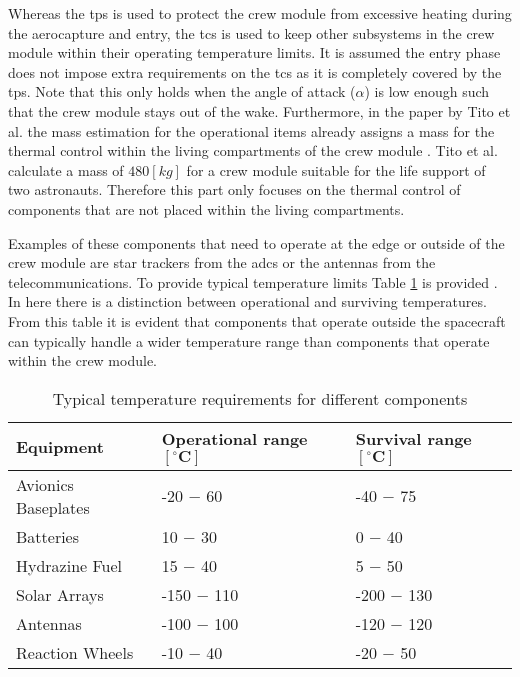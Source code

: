 Whereas the \gls{tps} is used to protect the crew module from excessive heating during the aerocapture and entry, the \gls{tcs} is used to keep other subsystems in the crew module within their operating temperature limits. It is assumed the entry phase does not impose extra requirements on the \gls{tcs} as it is completely covered by the \gls{tps}. Note that this only holds when the angle of attack ($\alpha$) is low enough such that the crew module stays out of the wake. Furthermore, in the paper by Tito et al. the mass estimation for the operational items already assigns a mass for the thermal control within the living compartments of the crew module \cite{Tito2013}. Tito et al. calculate a mass of $480 \left[kg\right]$ for a crew module suitable for the life support of two astronauts. Therefore this part only focuses on the thermal control of components that are not placed within the living compartments.

Examples of these components that need to operate at the edge or outside of the crew module are star trackers from the \gls{adcs} or the antennas from the telecommunications. To provide typical temperature limits Table \ref{tab:cmtherm} is provided \cite[p.686]{Wertz2011}. In here there is a distinction between operational and surviving temperatures. From this table it is evident that components that operate outside the spacecraft can typically handle a wider temperature range than components that operate within the crew module.

\begin{table}[h]
	\centering
	\caption{Typical temperature requirements for different components}
	\begin{tabular}{|l||l|l|}
		\hline
		\textbf{Equipment} & \textbf{Operational range $\mathbf{[^{\circ}C]}$} & \textbf{Survival range $\mathbf{[^{\circ}C]}$}\\ \hline \hline
		Avionics Baseplates & -20 $-$ 60 & -40 $-$ 75 \\
		Batteries & 10 $-$ 30 & 0 $-$ 40 \\
		Hydrazine Fuel & 15 $-$ 40 & 5 $-$ 50 \\
		Solar Arrays & -150 $-$ 110 & -200 $-$ 130 \\
		Antennas & -100 $-$ 100 & -120 $-$ 120 \\
		Reaction Wheels & -10 $-$ 40 & -20 $-$ 50 \\
		\hline
	\end{tabular}
	\label{tab:cmtherm}
\end{table}

